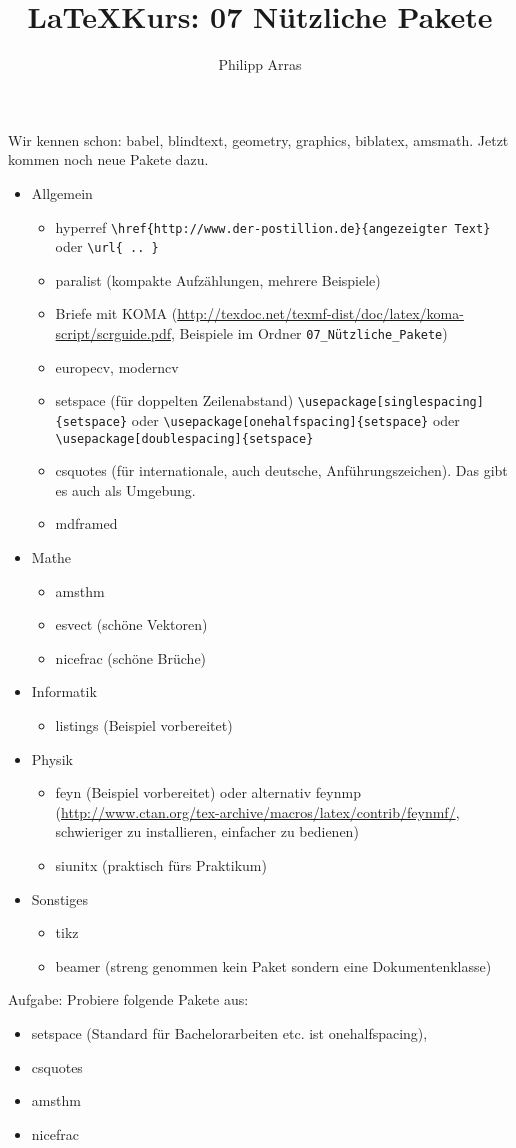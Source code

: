 \documentclass[11pt,a4paper]{scrartcl}
\author{Philipp Arras}
\title{\LaTeX Kurs: 07 Nützliche Pakete}
\begin{document}
\maketitle

Wir kennen schon: babel, blindtext, geometry, graphics, biblatex, amsmath. Jetzt kommen noch neue Pakete dazu.
\begin{itemize}
\item Allgemein
	\begin{itemize}
	\item hyperref \verb|\href{http://www.der-postillion.de}{angezeigter Text}| oder \verb|\url{ .. }|
	\item paralist (kompakte Aufzählungen, mehrere Beispiele)
	\item Briefe mit KOMA (\url{http://texdoc.net/texmf-dist/doc/latex/koma-script/scrguide.pdf}, Beispiele im Ordner \verb|07_Nützliche_Pakete|)
	\item europecv, moderncv
	\item setspace (für doppelten Zeilenabstand) \verb|\usepackage[singlespacing]{setspace}| oder \verb|\usepackage[onehalfspacing]{setspace}| oder \verb|\usepackage[doublespacing]{setspace}|
	\item csquotes (für internationale, auch deutsche, Anführungszeichen). Das gibt es auch als Umgebung.
	\item mdframed
	
	\end{itemize}
\item Mathe
	\begin{itemize}
	\item amsthm 
		
	\item esvect (schöne Vektoren)
	\item nicefrac (schöne Brüche)
	\end{itemize}
\item Informatik
	\begin{itemize}
	\item listings (Beispiel vorbereitet)
	\end{itemize}
\item Physik
	\begin{itemize}
	\item feyn (Beispiel vorbereitet) oder alternativ feynmp (\url{http://www.ctan.org/tex-archive/macros/latex/contrib/feynmf/}, schwieriger zu installieren, einfacher zu bedienen)
	\item siunitx (praktisch fürs Praktikum)
	\end{itemize}
\item Sonstiges
	\begin{itemize}
	\item tikz 
	\item beamer (streng genommen kein Paket sondern eine Dokumentenklasse)
	\end{itemize}
\end{itemize}

Aufgabe: Probiere folgende Pakete aus:
\begin{itemize}
\item setspace (Standard für Bachelorarbeiten etc. ist onehalfspacing), 
\item csquotes
\item amsthm
\item nicefrac
\end{itemize}
\end{document}
